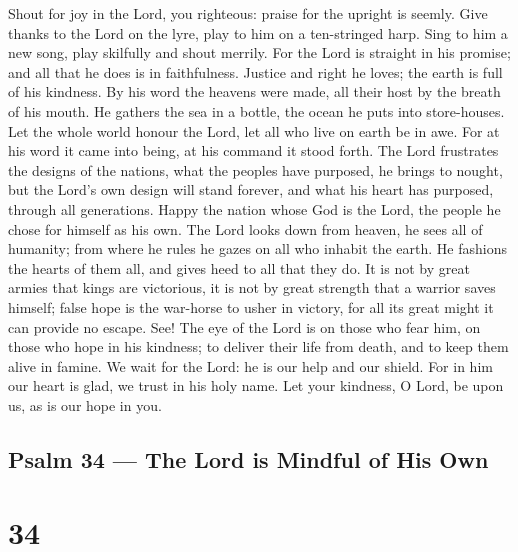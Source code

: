 Shout for joy in the Lord, you righteous: praise for the
upright is seemly.  Give thanks to the Lord on the lyre,
play to him on a ten-stringed harp.  Sing to him a new song,
play skilfully and shout merrily.  For the Lord is straight
in his promise; and all that he does is in faithfulness. 
Justice and right he loves; the earth is full of his kindness.
 By his word the heavens were made, all their host by the
breath of his mouth.  He gathers the sea in a bottle, the
ocean he puts into store-houses.  Let the whole world honour
the Lord, let all who live on earth be in awe.  For at his
word it came into being, at his command it stood forth. 
The Lord frustrates the designs of the nations, what the peoples have
purposed, he brings to nought,  but the Lord's own design
will stand forever, and what his heart has purposed, through all
generations.  Happy the nation whose God is the Lord, the
people he chose for himself as his own.  The Lord looks
down from heaven, he sees all of humanity;  from where he
rules he gazes on all who inhabit the earth.  He fashions
the hearts of them all, and gives heed to all that they do.
 It is not by great armies that kings are victorious, it is
not by great strength that a warrior saves himself;  false
hope is the war-horse to usher in victory, for all its great might it
can provide no escape.  See! The eye of the Lord is on
those who fear him, on those who hope in his kindness;  to
deliver their life from death, and to keep them alive in famine.
 We wait for the Lord: he is our help and our shield.
 For in him our heart is glad, we trust in his holy name.
 Let your kindness, O Lord, be upon us, as is our hope in
you.

\hypertarget{psalm-34-the-lord-is-mindful-of-his-own}{%
\subsection{Psalm 34 --- The Lord is Mindful of His
Own}\label{psalm-34-the-lord-is-mindful-of-his-own}}

\hypertarget{section-33}{%
\section{34}\label{section-33}}

